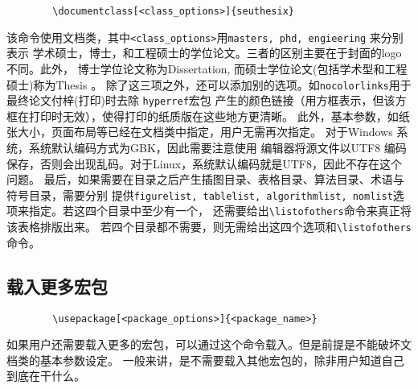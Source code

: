\documentclass[figurelist,tablelist,algorithmlist,nomlist,masters]{seuthesix}
\begin{document}
	{\color{magenta}
		\begin{verbatim}
		\documentclass[<class_options>]{seuthesix}
		\end{verbatim}
	}
	该命令使用\seuthesix 文档类，其中\verb+<class_options>+用\texttt{masters, phd, engieering} 来分别表示
	学术硕士，博士，和工程硕士的学位论文。三者的区别主要在于封面的logo 不同。此外，
	博士学位论文称为Dissertation, 而硕士学位论文(包括学术型和工程硕士)称为Thesis 。
	除了这三项之外，还可以添加别的选项。如{\texttt{nocolorlinks}}用于最终论文付梓(打印)时去除
	\texttt{hyperref}宏包
	产生的颜色链接（用方框表示，但该方框在打印时无效），使得打印的纸质版在这些地方更清晰。
	此外，基本参数，如纸张大小，页面布局等已经在文档类中指定，用户无需再次指定。
	对于Windows 系统，系统默认编码方式为GBK，因此需要注意使用
	编辑器将源文件以UTF8 编码保存，否则会出现乱码。对于Linux，系统默认编码就是UTF8，因此不存在这个问题。
	最后，如果需要在目录之后产生插图目录、表格目录、算法目录、术语与符号目录，需要分别
	提供\texttt{figurelist, tablelist, algorithmlist, nomlist}选项来指定。若这四个目录中至少有一个，
	还需要给出\verb+\listofothers+命令来真正将该表格排版出来。
	若四个目录都不需要，则无需给出这四个选项和\verb+\listofothers+命令。
	\subsection{载入更多宏包}
	{\color{magenta}
		\begin{verbatim}
		\usepackage[<package_options>]{<package_name>}
		\end{verbatim}
	}
	如果用户还需要载入更多的宏包，可以通过这个命令载入。但是前提是不能破坏\seuthesix 文档类的基本参数设定。
	一般来讲，是不需要载入其他宏包的，除非用户知道自己到底在干什么。
\end{document}
